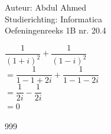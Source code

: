 \documentclass[a4paper]{article}
\begin{document}
\noindent \large Auteur: Abdul Ahmed \\
\noindent \large Studierichting: Informatica\\
\noindent \large Oefeningenreeks 1B nr. 20.4\\

\medskip

\normalsize

$\dfrac{1}{(1+i)^2} + \dfrac{1}{(1-i)^2} $ \\

$= \dfrac{1}{1 - 1 + 2i} + \dfrac{1}{1 - 1 - 2i}$ \\

$= \dfrac{1}{2i} - \dfrac{1}{2i}$ \\

$= 0$ \\

\begin{thebibliography}{999}
\end{thebibliography}
\end{document}
